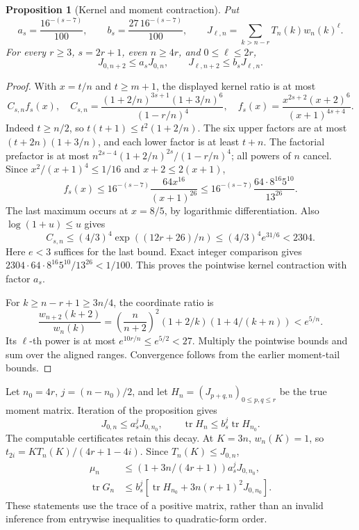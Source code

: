 \documentclass[11pt]{article}
\newtheorem{proposition}[theorem]{Proposition}
\theoremstyle{remark}
\begin{document}
\begin{proposition}[Kernel and moment contraction]
Put
\[
 a_s=\frac{16^{-(s-7)}}{100},\qquad
 b_s=\frac{27\,16^{-(s-7)}}{100},\qquad
 J_{\ell,n}=\sum_{k>n-r}T_n(k)w_n(k)^\ell.
\]
For every \(r\ge3\), \(s=2r+1\), even \(n\ge4r\), and
\(0\le\ell\le2r\),
\[
 J_{0,n+2}\le a_sJ_{0,n},\qquad
 J_{\ell,n+2}\le b_sJ_{\ell,n}.
\]
\end{proposition}
\begin{proof}
With \(x=t/n\) and \(t\ge m+1\), the displayed kernel ratio is at most
\[
 C_{s,n}f_s(x),\quad
 C_{s,n}=\frac{(1+2/n)^{3s+1}(1+3/n)^6}{(1-r/n)^4},\quad
 f_s(x)=\frac{x^{2s+2}(x+2)^6}{(x+1)^{4s+4}}.
\]
Indeed \(t\ge n/2\), so \(t(t+1)\le t^2(1+2/n)\).
The six upper factors are at most \((t+2n)(1+3/n)\), and
each lower factor is at least \(t+n\). The factorial prefactor is
at most \(n^{2s-4}(1+2/n)^{2s}/(1-r/n)^4\); all powers of \(n\) cancel.
Since \(x^2/(x+1)^4\le1/16\) and \(x+2\le2(x+1)\),
\[
 f_s(x)\le16^{-(s-7)}\frac{64x^{16}}{(x+1)^{26}}
 \le16^{-(s-7)}\frac{64\cdot8^{16}5^{10}}{13^{26}}.
\]
The last maximum occurs at \(x=8/5\), by logarithmic differentiation.
Also \(\log(1+u)\le u\) gives
\[
 C_{s,n}\le(4/3)^4\exp((12r+26)/n)
 \le(4/3)^4 e^{31/6}<2304.
\]
Here \(e<3\) suffices for the last bound. Exact integer comparison gives
\(2304\cdot64\cdot8^{16}5^{10}/13^{26}<1/100\).
This proves the pointwise kernel contraction with factor \(a_s\).

For \(k\ge n-r+1\ge3n/4\), the coordinate ratio is
\[
 \frac{w_{n+2}(k+2)}{w_n(k)}
 =\left(\frac n{n+2}\right)^2
   (1+2/k)(1+4/(k+n))<e^{5/n}.
\]
Its \(\ell\)-th power is at most \(e^{10r/n}\le e^{5/2}<27\).
Multiply the pointwise bounds and sum over the aligned ranges.
Convergence follows from the earlier moment-tail bounds.
\end{proof}

Let \(n_0=4r\), \(j=(n-n_0)/2\), and let
\(H_n=(J_{p+q,n})_{0\le p,q\le r}\) be the true moment matrix.
Iteration of the proposition gives
\[
 J_{0,n}\le a_s^jJ_{0,n_0},\qquad
 \operatorname{tr}H_n\le b_s^j\operatorname{tr}H_{n_0}.
\]
The computable certificates retain this decay. At \(K=3n\),
\(w_n(K)=1\), so
\(t_{2i}=KT_n(K)/(4r+1-4i)\). Since \(T_n(K)\le J_{0,n}\),
\begin{align*}
 \mu_n&\le(1+3n/(4r+1))a_s^jJ_{0,n_0},\\
 \operatorname{tr}G_n
 &\le b_s^j[\operatorname{tr}H_{n_0}+3n(r+1)^2J_{0,n_0}].
\end{align*}
These statements use the trace of a positive matrix, rather than an
invalid inference from entrywise inequalities to quadratic-form order.
\end{document}
